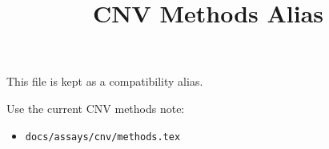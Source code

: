 \documentclass[11pt]{article}
\title{CNV Methods Alias}
\author{}
\date{}
\begin{document}
\maketitle

This file is kept as a compatibility alias.

Use the current CNV methods note:
\begin{itemize}
\item \texttt{docs/assays/cnv/methods.tex}
\end{itemize}
\end{document}
